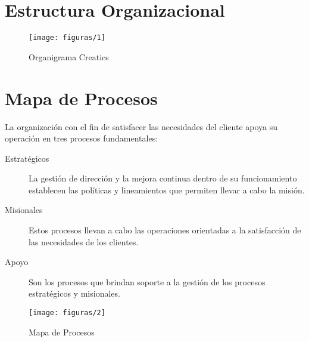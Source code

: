 \section{Estructura Organizacional}
  \begin{figure}[H]
  	\centering
  	\texttt{[image: figuras/1]}
  	\captionsetup{width=.95\textwidth}
  	\caption{Organigrama Creatics}
  	\label{figura1}
  \end{figure}
  
\section{Mapa de Procesos}
  La organización con el fin de satisfacer las necesidades del cliente apoya su operación en tres procesos fundamentales: \\
  \begin{description}
  	\item[Estratégicos] La gestión de dirección y la mejora continua dentro de su funcionamiento establecen las políticas y lineamientos que permiten llevar a cabo la misión.
  	\item[Misionales] Estos procesos llevan a cabo las operaciones orientadas a la satisfacción de las necesidades de los clientes.
  	\item[Apoyo] Son los procesos que brindan soporte a la gestión de los procesos estratégicos y misionales.
  \end{description}

  \begin{figure}[H]
  	\centering
  	\texttt{[image: figuras/2]}
  	\captionsetup{width=.95\textwidth}
  	\caption{Mapa de Procesos}
  	\label{figura2}
  \end{figure}